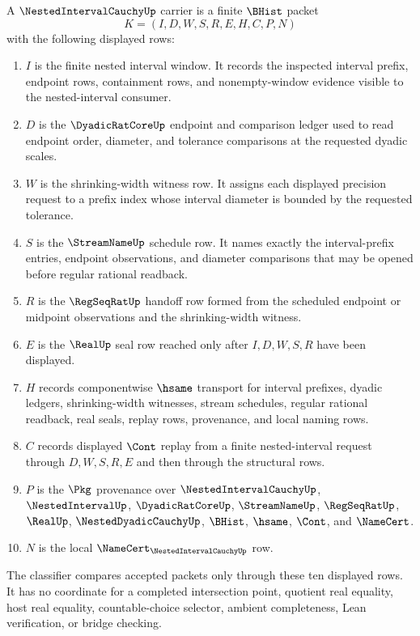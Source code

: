 \begin{definition}
\label{def:nested-interval-cauchy-carrier}
A $\NestedIntervalCauchyUp$ carrier is a finite $\BHist$ packet
$$
K=(I,D,W,S,R,E,H,C,P,N)
$$
with the following displayed rows:
\begin{enumerate}
\item $I$ is the finite nested interval window. It records the inspected interval prefix, endpoint rows, containment rows, and nonempty-window evidence visible to the nested-interval consumer.
\item $D$ is the $\DyadicRatCoreUp$ endpoint and comparison ledger used to read endpoint order, diameter, and tolerance comparisons at the requested dyadic scales.
\item $W$ is the shrinking-width witness row. It assigns each displayed precision request to a prefix index whose interval diameter is bounded by the requested tolerance.
\item $S$ is the $\StreamNameUp$ schedule row. It names exactly the interval-prefix entries, endpoint observations, and diameter comparisons that may be opened before regular rational readback.
\item $R$ is the $\RegSeqRatUp$ handoff row formed from the scheduled endpoint or midpoint observations and the shrinking-width witness.
\item $E$ is the $\RealUp$ seal row reached only after $I,D,W,S,R$ have been displayed.
\item $H$ records componentwise $\hsame$ transport for interval prefixes, dyadic ledgers, shrinking-width witnesses, stream schedules, regular rational readback, real seals, replay rows, provenance, and local naming rows.
\item $C$ records displayed $\Cont$ replay from a finite nested-interval request through $D,W,S,R,E$ and then through the structural rows.
\item $P$ is the $\Pkg$ provenance over $\NestedIntervalCauchyUp$, $\NestedIntervalUp$, $\DyadicRatCoreUp$, $\StreamNameUp$, $\RegSeqRatUp$, $\RealUp$, $\NestedDyadicCauchyUp$, $\BHist$, $\hsame$, $\Cont$, and $\NameCert$.
\item $N$ is the local $\NameCert_{\NestedIntervalCauchyUp}$ row.
\end{enumerate}
The classifier compares accepted packets only through these ten displayed rows. It has no coordinate for a completed intersection point, quotient real equality, host real equality, countable-choice selector, ambient completeness, Lean verification, or bridge checking.
\end{definition}

